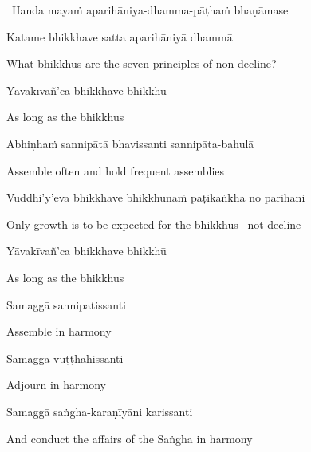 \begin{leader}
  \anglebracketleft\ \hspace{-0.5mm}Handa mayaṁ aparihāniya-dhamma-pāṭhaṁ bhaṇāmase \hspace{-0.5mm}\anglebracketright\
\end{leader}

Katame bhikkhave satta aparihāniyā dhammā

\begin{english}
  What bhikkhus are the seven principles of non-decline?
\end{english}

Yāvakīvañ'ca bhikkhave bhikkhū

\begin{english}
  As long as the bhikkhus
\end{english}

Abhiṇhaṁ sannipātā bhavissanti sannipāta-bahulā

\begin{english}
  Assemble often and hold frequent assemblies
\end{english}

\begin{pali-hang}
Vuddhi'y'eva bhikkhave bhikkhūnaṁ pāṭikaṅkhā no parihāni
\end{pali-hang}

\begin{english-hang}
  Only growth is to be expected for the bhikkhus \breathmark\ not decline
\end{english-hang}

Yāvakīvañ'ca bhikkhave bhikkhū

\begin{english}
  As long as the bhikkhus
\end{english}

Samaggā sannipatissanti

\begin{english}
  Assemble in harmony
\end{english}

Samaggā vuṭṭhahissanti

\begin{english}
  Adjourn in harmony
\end{english}

Samaggā saṅgha-karaṇīyāni karissanti

\begin{english}
  And conduct the affairs of the Saṅgha in harmony
\end{english}

